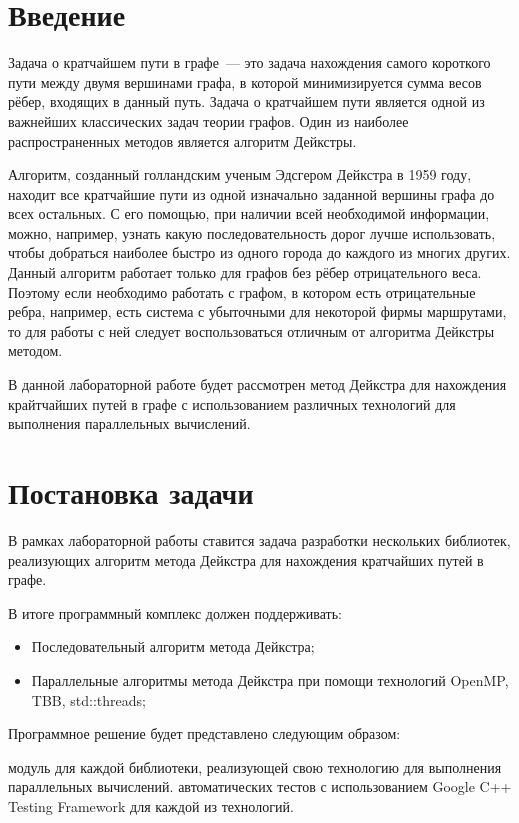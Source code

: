 \documentclass{report}
\begin{document}
\setcounter{page}{2}

\tableofcontents
\newpage

\section*{Введение}
Задача о кратчайшем пути в графе~--- это задача нахождения самого короткого пути между двумя вершинами графа, в которой минимизируется сумма весов рёбер, 
входящих в данный путь.  Задача о кратчайшем пути является одной из важнейших классических задач теории графов. Один из наиболее распространенных методов является алгоритм Дейкстры.
\par Алгоритм, созданный голландским ученым Эдсгером Дейкстра в 1959 году, находит все кратчайшие пути из одной изначально заданной вершины графа до всех остальных. 
С его помощью, при наличии всей необходимой информации, можно, например, узнать какую последовательность дорог лучше использовать, чтобы добраться наиболее 
быстро из одного города до каждого из многих других. Данный алгоритм работает только для графов без рёбер отрицательного веса. Поэтому если необходимо работать с графом, 
в котором есть отрицательные ребра, например, есть система с убыточными для некоторой фирмы маршрутами, то для работы с ней следует воспользоваться отличным от алгоритма Дейкстры методом.
\par В данной лабораторной работе будет рассмотрен метод Дейкстра для нахождения крайтчайших путей в графе с использованием различных технологий для выполнения параллельных вычислений.
\newpage

\section*{Постановка задачи}
В рамках лабораторной работы ставится задача разработки нескольких библиотек, реализующих алгоритм метода Дейкстра для нахождения кратчайших путей в графе.
\par В итоге программный комплекс должен поддерживать:
\begin{itemize}
\item Последовательный алгоритм метода Дейкстра;
\item Параллельные алгоритмы метода Дейкстра при помощи технологий OpenMP, TBB, std::threads;
\end{itemize}
\par Программное решение будет представлено следующим образом:
\begin{enumerate} 
 модуль для каждой библиотеки, реализующей свою технологию для выполнения параллельных вычислений.
 автоматических тестов с использованием Google C++ Testing Framework для каждой из технологий.
\end{enumerate} 
\newpage
\end{document}

